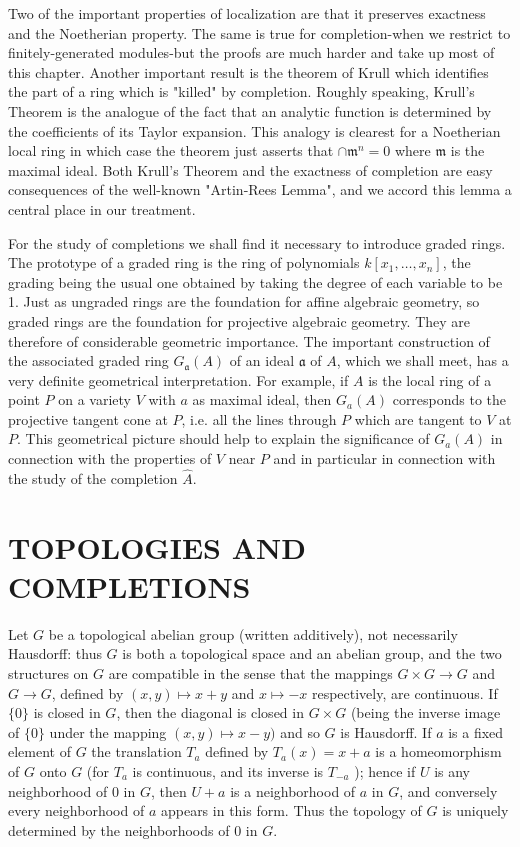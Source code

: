 \documentclass{standalone}
\theoremstyle{definition}
\theoremstyle{remark}
\begin{document}
Two of the important properties of localization are that it preserves exactness and the Noetherian property. The same is true for completion-when we restrict to finitely-generated modules-but the proofs are much harder and take up most of this chapter. Another important result is the theorem of Krull which identifies the part of a ring which is "killed" by completion. Roughly speaking, Krull's Theorem is the analogue of the fact that an analytic function is determined by the coefficients of its Taylor expansion. This analogy is clearest for a Noetherian local ring in which case the theorem just asserts that $\cap \mathfrak{m}^{n}=0$ where $\mathfrak{m}$ is the maximal ideal. Both Krull's Theorem and the exactness of completion are easy consequences of the well-known "Artin-Rees Lemma", and we accord this lemma a central place in our treatment.

For the study of completions we shall find it necessary to introduce graded rings. The prototype of a graded ring is the ring of polynomials $k\left[x_{1}, \ldots, x_{n}\right]$, the grading being the usual one obtained by taking the degree of each variable to be 1. Just as ungraded rings are the foundation for affine algebraic geometry, so graded rings are the foundation for projective algebraic geometry. They are therefore of considerable geometric importance. The important construction of the associated graded ring $G_{\mathfrak{a}}(A)$ of an ideal $\mathfrak{a}$ of $A$, which we shall meet, has a very definite geometrical interpretation. For example, if $A$ is the local ring of a point $P$ on a variety $V$ with $a$ as maximal ideal, then $G_{a}(A)$ corresponds to the projective tangent cone at $P$, i.e. all the lines through $P$ which are tangent to $V$ at $P$. This geometrical picture should help to explain the significance of $G_{a}(A)$ in connection with the properties of $V$ near $P$ and in particular in connection with the study of the completion $\hat{A}$.

\section{TOPOLOGIES AND COMPLETIONS}
Let $G$ be a topological abelian group (written additively), not necessarily Hausdorff: thus $G$ is both a topological space and an abelian group, and the two structures on $G$ are compatible in the sense that the mappings $G \times G \rightarrow G$ and $G \rightarrow G$, defined by $(x, y) \mapsto x+y$ and $x \mapsto-x$ respectively, are continuous. If $\{0\}$ is closed in $G$, then the diagonal is closed in $G \times G$ (being the inverse image of $\{0\}$ under the mapping $(x, y) \mapsto x-y)$ and so $G$ is Hausdorff. If $a$ is a fixed element of $G$ the translation $T_{a}$ defined by $T_{a}(x)=x+a$ is a homeomorphism of $G$ onto $G$ (for $T_{a}$ is continuous, and its inverse is $T_{-a}$ ); hence if $U$ is any neighborhood of 0 in $G$, then $U+a$ is a neighborhood of $a$ in $G$, and conversely every neighborhood of $a$ appears in this form. Thus the topology of $G$ is uniquely determined by the neighborhoods of 0 in $G$.
\end{document}
